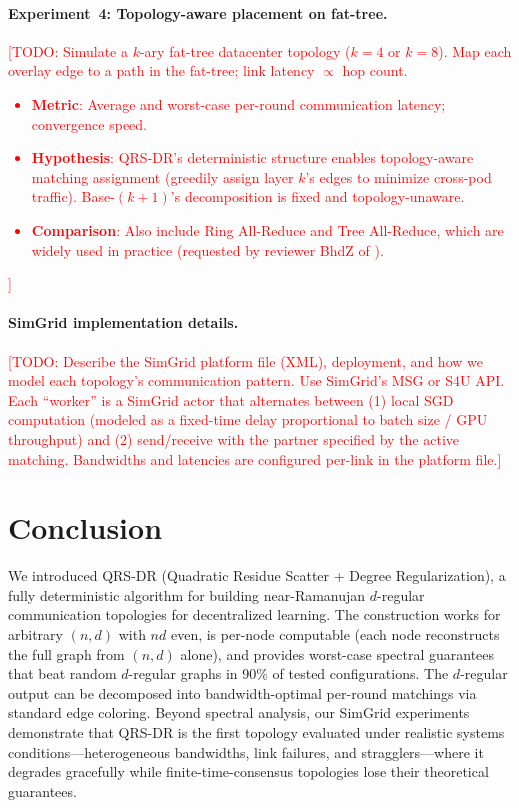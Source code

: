 \documentclass{article}
\begin{document}
\paragraph{Experiment~4: Topology-aware placement on fat-tree.}
\textcolor{red}{[TODO: Simulate a $k$-ary fat-tree datacenter topology
($k=4$ or $k=8$).  Map each overlay edge to a path in the fat-tree;
link latency $\propto$ hop count.
\begin{itemize}
\item \textbf{Metric}: Average and worst-case per-round communication
    latency; convergence speed.
\item \textbf{Hypothesis}: QRS-DR's deterministic structure enables
    topology-aware matching assignment (greedily assign layer $k$'s edges
    to minimize cross-pod traffic).  Base-$(k{+}1)$'s decomposition is
    fixed and topology-unaware.
\item \textbf{Comparison}: Also include Ring All-Reduce and Tree
    All-Reduce, which are widely used in practice (requested by
    reviewer BhdZ of \cite{takezawa2023base}).
\end{itemize}]}

\paragraph{SimGrid implementation details.}
\textcolor{red}{[TODO: Describe the SimGrid platform file (XML),
deployment, and how we model each topology's communication pattern.
Use SimGrid's MSG or S4U API.  Each ``worker'' is a SimGrid actor that
alternates between (1) local SGD computation (modeled as a fixed-time
delay proportional to batch size / GPU throughput) and (2) send/receive
with the partner specified by the active matching.  Bandwidths and
latencies are configured per-link in the platform file.]}


\section{Conclusion}
\label{sec:conclusion}

We introduced QRS-DR (Quadratic Residue Scatter + Degree Regularization),
a fully deterministic algorithm for building near-Ramanujan $d$-regular
communication topologies for decentralized learning.  The construction
works for arbitrary $(n, d)$ with $nd$ even, is per-node computable
(each node reconstructs the full graph from $(n,d)$ alone), and provides
worst-case spectral guarantees that beat random $d$-regular graphs in
90\% of tested configurations.  The $d$-regular output can be decomposed
into bandwidth-optimal per-round matchings via standard edge coloring.
Beyond spectral analysis, our SimGrid experiments demonstrate that
QRS-DR is the first topology evaluated under realistic systems
conditions---heterogeneous bandwidths, link failures, and
stragglers---where it degrades gracefully while finite-time-consensus
topologies lose their theoretical guarantees.
\end{document}
